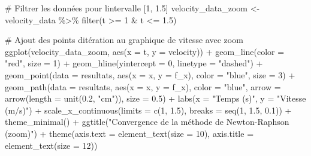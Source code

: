 \documentclass[
  12pt,
  letterpaper,
]{book}
\newenvironment{Shaded}{}{}
\newcommand{\AttributeTok}[1]{\textcolor[rgb]{0.84,0.23,0.29}{#1}}
\newcommand{\CommentTok}[1]{\textcolor[rgb]{0.42,0.45,0.49}{#1}}
\newcommand{\DecValTok}[1]{\textcolor[rgb]{0.00,0.36,0.77}{#1}}
\newcommand{\FloatTok}[1]{\textcolor[rgb]{0.00,0.36,0.77}{#1}}
\newcommand{\FunctionTok}[1]{\textcolor[rgb]{0.44,0.26,0.76}{#1}}
\newcommand{\NormalTok}[1]{\textcolor[rgb]{0.14,0.16,0.18}{#1}}
\newcommand{\OtherTok}[1]{\textcolor[rgb]{0.44,0.26,0.76}{#1}}
\newcommand{\SpecialCharTok}[1]{\textcolor[rgb]{0.00,0.36,0.77}{#1}}
\newcommand{\StringTok}[1]{\textcolor[rgb]{0.01,0.18,0.38}{#1}}
\theoremstyle{remark}
\begin{document}
\begin{Shaded}
\begin{Highlighting}[]
\CommentTok{\# Filtrer les données pour l\textquotesingle{}intervalle [1, 1.5]}
\NormalTok{velocity\_data\_zoom }\OtherTok{\textless{}{-}}\NormalTok{ velocity\_data }\SpecialCharTok{\%\textgreater{}\%} 
  \FunctionTok{filter}\NormalTok{(t }\SpecialCharTok{\textgreater{}=} \DecValTok{1} \SpecialCharTok{\&}\NormalTok{ t }\SpecialCharTok{\textless{}=} \FloatTok{1.5}\NormalTok{)}

\CommentTok{\# Ajout des points d\textquotesingle{}itération au graphique de vitesse avec zoom}
\FunctionTok{ggplot}\NormalTok{(velocity\_data\_zoom, }\FunctionTok{aes}\NormalTok{(}\AttributeTok{x =}\NormalTok{ t, }\AttributeTok{y =}\NormalTok{ velocity)) }\SpecialCharTok{+}
  \FunctionTok{geom\_line}\NormalTok{(}\AttributeTok{color =} \StringTok{"red"}\NormalTok{, }\AttributeTok{size =} \DecValTok{1}\NormalTok{) }\SpecialCharTok{+}
  \FunctionTok{geom\_hline}\NormalTok{(}\AttributeTok{yintercept =} \DecValTok{0}\NormalTok{, }\AttributeTok{linetype =} \StringTok{"dashed"}\NormalTok{) }\SpecialCharTok{+}
  \FunctionTok{geom\_point}\NormalTok{(}\AttributeTok{data =}\NormalTok{ resultats, }
             \FunctionTok{aes}\NormalTok{(}\AttributeTok{x =}\NormalTok{ x, }\AttributeTok{y =}\NormalTok{ f\_x),}
             \AttributeTok{color =} \StringTok{"blue"}\NormalTok{,}
             \AttributeTok{size =} \DecValTok{3}\NormalTok{) }\SpecialCharTok{+}
  \FunctionTok{geom\_path}\NormalTok{(}\AttributeTok{data =}\NormalTok{ resultats, }
            \FunctionTok{aes}\NormalTok{(}\AttributeTok{x =}\NormalTok{ x, }\AttributeTok{y =}\NormalTok{ f\_x),}
            \AttributeTok{color =} \StringTok{"blue"}\NormalTok{,}
            \AttributeTok{arrow =} \FunctionTok{arrow}\NormalTok{(}\AttributeTok{length =} \FunctionTok{unit}\NormalTok{(}\FloatTok{0.2}\NormalTok{, }\StringTok{"cm"}\NormalTok{)),}
            \AttributeTok{size =} \FloatTok{0.5}\NormalTok{) }\SpecialCharTok{+}
  \FunctionTok{labs}\NormalTok{(}\AttributeTok{x =} \StringTok{"Temps (s)"}\NormalTok{, }\AttributeTok{y =} \StringTok{"Vitesse (m/s)"}\NormalTok{) }\SpecialCharTok{+}
  \FunctionTok{scale\_x\_continuous}\NormalTok{(}\AttributeTok{limits =} \FunctionTok{c}\NormalTok{(}\DecValTok{1}\NormalTok{, }\FloatTok{1.5}\NormalTok{),}
                    \AttributeTok{breaks =} \FunctionTok{seq}\NormalTok{(}\DecValTok{1}\NormalTok{, }\FloatTok{1.5}\NormalTok{, }\FloatTok{0.1}\NormalTok{)) }\SpecialCharTok{+}
  \FunctionTok{theme\_minimal}\NormalTok{() }\SpecialCharTok{+}
  \FunctionTok{ggtitle}\NormalTok{(}\StringTok{"Convergence de la méthode de Newton{-}Raphson (zoom)"}\NormalTok{) }\SpecialCharTok{+}
  \FunctionTok{theme}\NormalTok{(}\AttributeTok{axis.text =} \FunctionTok{element\_text}\NormalTok{(}\AttributeTok{size =} \DecValTok{10}\NormalTok{),}
        \AttributeTok{axis.title =} \FunctionTok{element\_text}\NormalTok{(}\AttributeTok{size =} \DecValTok{12}\NormalTok{))}
\end{Highlighting}
\end{Shaded}
\end{document}
